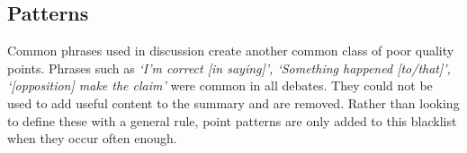     \tocless\subsection{Patterns}
      Common phrases used in discussion create another common class of poor quality points. Phrases such as \textit{`I'm correct [in saying]', `Something happened [to/that]', `[opposition] make the claim'} were common in all debates. They could not be used to add useful content to the summary and are removed. Rather than looking to define these with a general rule, point patterns are only added to this blacklist when they occur often enough.
